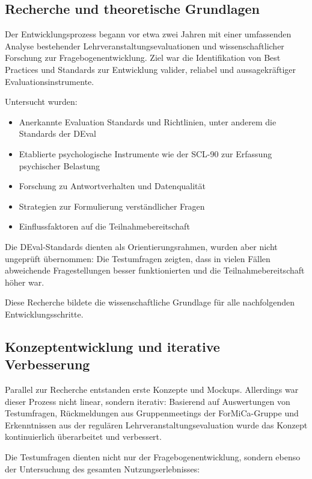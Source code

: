 \documentclass[12pt,a4paper,oneside]{article}
\begin{document}
\subsection{Recherche und theoretische Grundlagen}

Der Entwicklungsprozess begann vor etwa zwei Jahren mit einer umfassenden Analyse bestehender Lehrveranstaltungsevaluationen und wissenschaftlicher Forschung zur Fragebogenentwicklung. Ziel war die Identifikation von Best Practices und Standards zur Entwicklung valider, reliabel und aussagekräftiger Evaluationsinstrumente.

Untersucht wurden:

\begin{itemize}
    \item Anerkannte Evaluation Standards und Richtlinien, unter anderem die Standards der DEval
    \item Etablierte psychologische Instrumente wie der SCL-90 zur Erfassung psychischer Belastung
    \item Forschung zu Antwortverhalten und Datenqualität
    \item Strategien zur Formulierung verständlicher Fragen
    \item Einflussfaktoren auf die Teilnahmebereitschaft
\end{itemize}

Die DEval-Standards dienten als Orientierungsrahmen, wurden aber nicht ungeprüft übernommen: Die Testumfragen zeigten, dass in vielen Fällen abweichende Fragestellungen besser funktionierten und die Teilnahmebereitschaft höher war.

Diese Recherche bildete die wissenschaftliche Grundlage für alle nachfolgenden Entwicklungsschritte.

\subsection{Konzeptentwicklung und iterative Verbesserung}

Parallel zur Recherche entstanden erste Konzepte und Mockups. Allerdings war dieser Prozess nicht linear, sondern iterativ: Basierend auf Auswertungen von Testumfragen, Rückmeldungen aus Gruppenmeetings der ForMiCa-Gruppe und Erkenntnissen aus der regulären Lehrveranstaltungsevaluation wurde das Konzept kontinuierlich überarbeitet und verbessert.

Die Testumfragen dienten nicht nur der Fragebogenentwicklung, sondern ebenso der Untersuchung des gesamten Nutzungserlebnisses:
\end{document}
